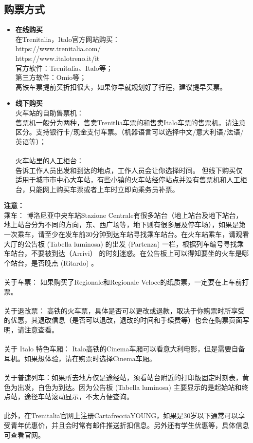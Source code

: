\subsection{购票方式}
\begin{itemize}
\item  \textbf{在线购买}\\
在Trenitalia，Italo官方网站购买：\\
https://www.trenitalia.com/\\
https://www.italotreno.it/it\\
官方软件：Trenitalia、Italo等；\\
第三方软件：Omio等；\\
高铁车票提前买折扣很大，如果你早就规划好了行程，建议提早买票。\\
\item  \textbf{线下购买}\\
火车站的自助售票机：\\
售票机一般分为两种，售卖Trenitlia车票的和售卖Italo车票的售票机，请注意区分。支持银行卡/现金支付车票。（机器语言可以选择中文/意大利语/法语/英语等）；\\
\\
火车站里的人工柜台：\\
告诉工作人员出发和到达的地点，工作人员会让你选择时间。
但线下购买仅适用于城市市中心大车站，有些小镇的火车站经停站点并没有售票机和人工柜台，只能网上购买车票或者上车时立即向乘务员补票。
\end{itemize}
\textbf{注意：}\\
乘车：
博洛尼亚中央车站Stazione Centrale有很多站台（地上站台及地下站台，地上站台分为不同的方向，东、西广场等，地下则有很多层及停车场），如果是第一次乘车，请至少在发车前30分钟到达车站寻找乘车站台。在火车站乘车，请观看大厅的公告板 (Tabella luminosa) 的出发 (Partenza) 一栏，根据列车编号寻找乘车站台，不要被到达（Arrivi） 的时刻迷惑。在公告板上可以得知要坐的火车是哪个站台，是否晚点 (Ritardo) 。\\
\\
关于车票：
如果购买了Regionale和Regionale Veloce的纸质票，一定要在上车前打票。\\
\\
关于退改票：
高铁的火车票，具体是否可以更改或退款，取决于你购票时所享受的优惠，其退改信息（是否可以退改，退改的时间和手续费等）也会在购票页面写明，请注意查看。\\
\\
关于 Italo 特色车厢：
Italo高铁的Cinema车厢可以看意大利电影，但是需要自备耳机。如果想体验，请在购票时选择Cinema车厢。\\
\\
关于普速列车：如果所去地方仅是途经站，须看站台附近的打印版固定时刻表，黄色为出发，白色为到达。因为公告板 (Tabella luminosa) 主要显示的是起始站和终点站，途径车站滚动显示，不太方便查询。 \\
\\
此外，在Trenitalia官网上注册CartafrecciaYOUNG，如果是30岁以下通常可以享受青年优惠价，并且会时常有邮件推送折扣信息。另外还有学生优惠等，具体信息可查看官网。\\



